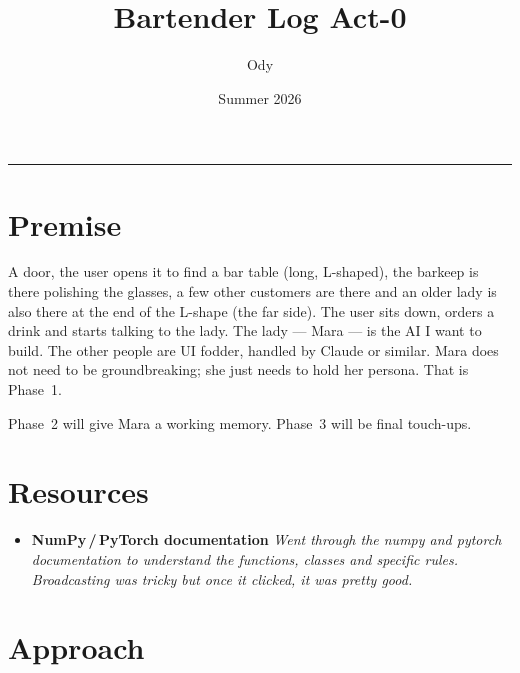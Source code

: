 \documentclass[11pt,a4paper]{article}
\title{\textbf{Bartender Log Act-0}}
\author{Ody}
\date{Summer 2026}
\begin{document}

\maketitle
\tableofcontents

\bigskip
\hrule
\bigskip

\section{Premise}
\label{sec:premise}

A door, the user opens it to find a bar table (long, L-shaped), the barkeep is there polishing the glasses, a few other customers are there and an older lady is also there at the end of the L-shape (the far side). The user sits down, orders a drink and starts talking to the lady.
The lady --- Mara --- is the AI I want to build. The other people are UI fodder, handled by Claude or similar. Mara does not need to be groundbreaking; she just needs to hold her persona. That is Phase~1.

Phase~2 will give Mara a working memory. Phase~3 will be final touch-ups.


\section{Resources}
\label{sec:resources}

\begin{itemize}[leftmargin=1.5em, itemsep=0.3em]
  \item \textbf{NumPy\,/\,PyTorch documentation} \textemdash{}
        \textit{Went through the numpy and pytorch documentation to understand the functions, classes and specific rules. Broadcasting was tricky but once it clicked, it was pretty good.}
\end{itemize}

\section{Approach}
\label{sec:approach}
\end{document}
